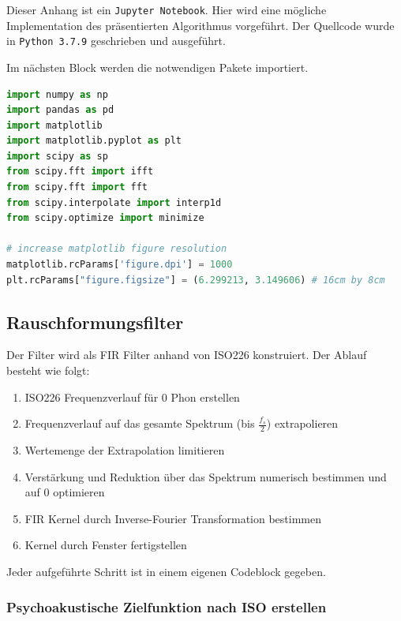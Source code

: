 Dieser Anhang ist ein \texttt{Jupyter Notebook}. Hier wird eine mögliche
Implementation des präsentierten Algorithmus vorgeführt. Der Quellcode
wurde in \texttt{Python 3.7.9} geschrieben und ausgeführt.

Im nächsten Block werden die notwendigen Pakete importiert.

\begin{lstlisting}[language=Python]
import numpy as np
import pandas as pd
import matplotlib
import matplotlib.pyplot as plt
import scipy as sp
from scipy.fft import ifft
from scipy.fft import fft
from scipy.interpolate import interp1d
from scipy.optimize import minimize

# increase matplotlib figure resolution
matplotlib.rcParams['figure.dpi'] = 1000
plt.rcParams["figure.figsize"] = (6.299213, 3.149606) # 16cm by 8cm
\end{lstlisting}

\hypertarget{rauschformungsfilter}{%
\subsection{Rauschformungsfilter}\label{rauschformungsfilter}}

Der Filter wird als FIR Filter anhand von ISO226 konstruiert. Der Ablauf
besteht wie folgt:

\begin{enumerate}
\tightlist
\item
  ISO226 Frequenzverlauf für 0 Phon erstellen
\item
  Frequenzverlauf auf das gesamte Spektrum (bis \(\frac{f_s}{2}\))
  extrapolieren
\item
  Wertemenge der Extrapolation limitieren
\item
  Verstärkung und Reduktion über das Spektrum numerisch bestimmen und
  auf 0 optimieren
\item
  FIR Kernel durch Inverse-Fourier Transformation bestimmen
\item
  Kernel durch Fenster fertigstellen
\end{enumerate}

Jeder aufgeführte Schritt ist in einem eigenen Codeblock gegeben.

\hypertarget{psychoakustische-zielfunktion-nach-iso-erstellen}{%
\subsubsection{Psychoakustische Zielfunktion nach ISO
erstellen}\label{psychoakustische-zielfunktion-nach-iso-erstellen}}

